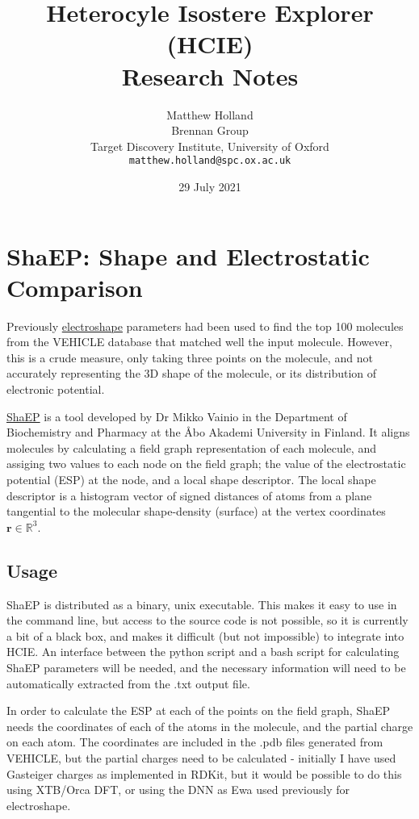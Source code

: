 \documentclass[11pt]{article} %
\title{Heterocyle Isostere Explorer (HCIE) \\ Research Notes}
\author{Matthew Holland \\ Brennan Group \\ Target Discovery Institute, University of Oxford \\ \texttt{matthew.holland@spc.ox.ac.uk}}
\date{29 July 2021}
\begin{document}
\maketitle

\section{ShaEP: Shape and Electrostatic Comparison}
Previously \href{https://doi.org/10.1007/s10822-010-9374-0}{electroshape} parameters had been used to find the top 100 molecules from the VEHICLE database that matched well the input molecule. However, this is a crude measure, only taking three points on the molecule, and not accurately representing the 3D shape of the molecule, or its distribution of electronic potential.

\href{https://doi.org/10.1021/ci800315d}{ShaEP} is a tool developed by Dr Mikko Vainio in the Department of Biochemistry and Pharmacy at the \AA bo Akademi University in Finland. It aligns molecules by calculating a field graph representation of each molecule, and assiging two values to each node on the field graph; the value of the electrostatic potential (ESP) at the node, and a local shape descriptor. The local shape descriptor is a histogram vector of signed distances of atoms from a plane tangential to the molecular shape-density (surface) at the vertex coordinates $\textbf{r} \in \mathbb{R}^3$.

\subsection{Usage}
ShaEP is distributed as a binary, unix executable. This makes it easy to use in the command line, but access to the source code is not possible, so it is currently a bit of a black box, and makes it difficult (but not impossible) to integrate into HCIE. An interface between the python script and a bash script for calculating ShaEP parameters will be needed, and the necessary information will need to be automatically extracted from the .txt output file.

In order to calculate the ESP at each of the points on the field graph, ShaEP needs the coordinates of each of the atoms in the molecule, and the partial charge on each atom. The coordinates are included in the .pdb files generated from VEHICLE, but the partial charges need to be calculated - initially I have used Gasteiger charges as implemented in RDKit, but it would be possible to do this using XTB/Orca DFT, or using the DNN as Ewa used previously for electroshape.
\end{document}
